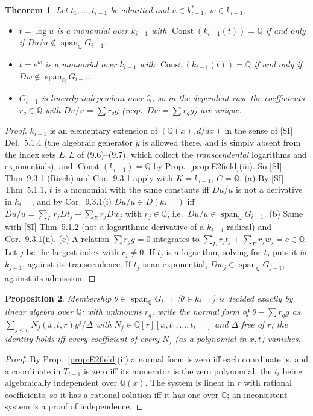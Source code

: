\documentclass[11pt]{article}
\newtheorem{theorem}{Theorem}[section]
\newtheorem{proposition}[theorem]{Proposition}
\theoremstyle{definition}
\theoremstyle{remark}
\newcommand{\Q}{\mathbb{Q}}
\newcommand{\C}{\mathbb{C}}
\begin{document}
\begin{theorem}\label{thm:E2struct}
Let $t_1,\dots,t_{i-1}$ be admitted and $u\in k_{i-1}^*$, $w\in k_{i-1}$.
\begin{itemize}
\item[(a)] $t=\log u$ is a monomial over $k_{i-1}$ with
$\operatorname{Const}(k_{i-1}(t))=\Q$ if and only if $Du/u\notin\operatorname{span}_\Q G_{i-1}$.
\item[(b)] $t=e^w$ is a monomial over $k_{i-1}$ with
$\operatorname{Const}(k_{i-1}(t))=\Q$ if and only if $Dw\notin\operatorname{span}_\Q G_{i-1}$.
\item[(c)] $G_{i-1}$ is linearly independent over $\Q$, so in the dependent case the
coefficients $r_g\in\Q$ with $Du/u=\sum r_gg$ (resp.\ $Dw=\sum r_gg$) are unique.
\end{itemize}
\end{theorem}
\begin{proof}
$k_{i-1}$ is an elementary extension of $(\Q(x),d/dx)$ in the sense of [SI] Def.~5.1.4
(the algebraic generator $y$ is allowed there, and is simply absent from the index sets
$E,L$ of (9.6)--(9.7), which collect the \emph{transcendental} logarithms and
exponentials), and $\operatorname{Const}(k_{i-1})=\Q$ by Prop.~\ref{prop:E2field}(iii).
So [SI] Thm~9.3.1 (Risch) and Cor.~9.3.1 apply with $K=k_{i-1}$, $C=\Q$.
(a) By [SI] Thm~5.1.1, $t$ is a monomial with the same constants iff $Du/u$ is not a
derivative in $k_{i-1}$, and by Cor.~9.3.1(i) $Du/u\in D(k_{i-1})$ iff
$Du/u=\sum_{L}r_jDt_j+\sum_Er_jDw_j$ with $r_j\in\Q$, i.e.\ $Du/u\in\operatorname{span}_\Q G_{i-1}$.
(b) Same with [SI] Thm~5.1.2 (not a logarithmic derivative of a $k_{i-1}$-radical) and
Cor.~9.3.1(ii).
(c) A relation $\sum r_gg=0$ integrates to $\sum_Lr_jt_j+\sum_Er_jw_j=c\in\Q$. Let $j$ be
the largest index with $r_j\ne0$. If $t_j$ is a logarithm, solving for $t_j$ puts it in
$k_{j-1}$, against its transcendence. If $t_j$ is an exponential, $Dw_j\in\operatorname{span}_\Q G_{j-1}$, against
its admission.
\end{proof}

\begin{proposition}\label{prop:E2span}
Membership $\theta\in\operatorname{span}_\Q G_{i-1}$ ($\theta\in k_{i-1}$) is decided
exactly by linear algebra over $\Q$: with unknowns $r_g$, write the normal form of
$\theta-\sum r_gg$ as $\sum_{j<n}N_j(x,t,r)y^j/\Delta$ with $N_j\in\Q[r][x,t_1,\dots,t_{i-1}]$
and $\Delta$ free of $r$; the identity holds iff every coefficient of every $N_j$ (as a
polynomial in $x,t$) vanishes.
\end{proposition}
\begin{proof}
By Prop.~\ref{prop:E2field}(ii) a normal form is zero iff each coordinate is, and a
coordinate in $T_{i-1}$ is zero iff its numerator is the zero polynomial, the $t_l$ being
algebraically independent over $\Q(x)$. The system is linear in $r$ with rational
coefficients, so it has a rational solution iff it has one over $\C$; an inconsistent
system is a proof of independence.
\end{proof}
\end{document}
